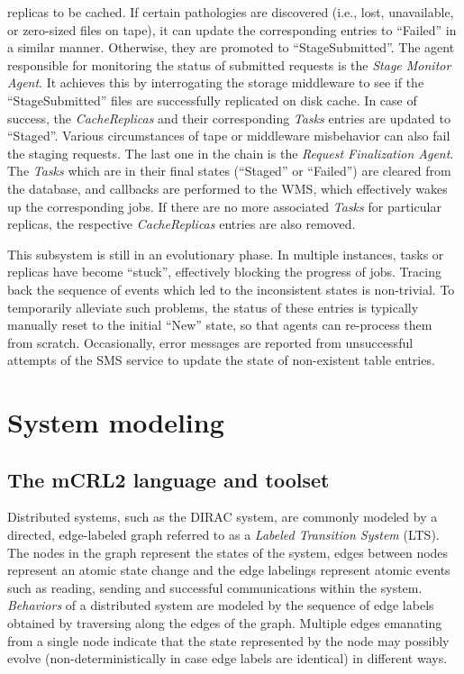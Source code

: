 \documentclass[sort&compress,preprint,3p]{elsarticle}
\begin{document}
replicas to be cached. If certain pathologies are discovered (i.e., lost,
unavailable, or zero-sized files on tape), it can update the corresponding
entries to ``Failed'' in a similar manner. Otherwise, they are promoted to
``StageSubmitted''. The agent responsible for monitoring the status of submitted
requests is the \textit{Stage Monitor Agent}. It achieves this by interrogating the
storage middleware to see if the ``StageSubmitted'' files are successfully
replicated on disk cache. In case of success, the \textit{CacheReplicas} and their
corresponding \textit{Tasks} entries are updated to ``Staged''. Various circumstances of
tape or middleware misbehavior can also fail the staging requests. The last one
in the chain is the \textit{Request Finalization Agent}. The \textit{Tasks} which are in their
final states (``Staged'' or ``Failed'') are cleared from the database, and callbacks
are performed to the WMS, which effectively wakes up the corresponding jobs. If
there are no more associated \textit{Tasks} for particular replicas, the respective
\textit{CacheReplicas} entries are also removed.

This subsystem is still in an evolutionary phase. In multiple instances, tasks or
replicas have become “stuck”, effectively blocking the progress of jobs. Tracing
back the sequence of events which led to the inconsistent states is non-trivial.
To temporarily alleviate such problems, the status of these entries is typically manually
reset to the initial ``New'' state, so that agents can re-process them from
scratch. Occasionally, error messages are reported from unsuccessful attempts of
the SMS service to update the state of non-existent table entries.

\section{System modeling}

\subsection{The mCRL2 language and toolset}

Distributed systems, such as the DIRAC system, are commonly modeled
by a directed, edge-labeled graph referred to as a \emph{Labeled
Transition System} (LTS). The nodes in the graph represent the states
of the system, edges between nodes represent an atomic state change
and the edge labelings represent atomic events such as reading, sending
and successful communications within the system. \emph{Behaviors} of a
distributed system are modeled by the sequence of edge labels obtained
by traversing along the edges of the graph.  Multiple edges emanating
from a single node indicate that the state represented by the node may
possibly evolve (non-deterministically in case edge labels are identical)
in different ways. 
\end{document}
